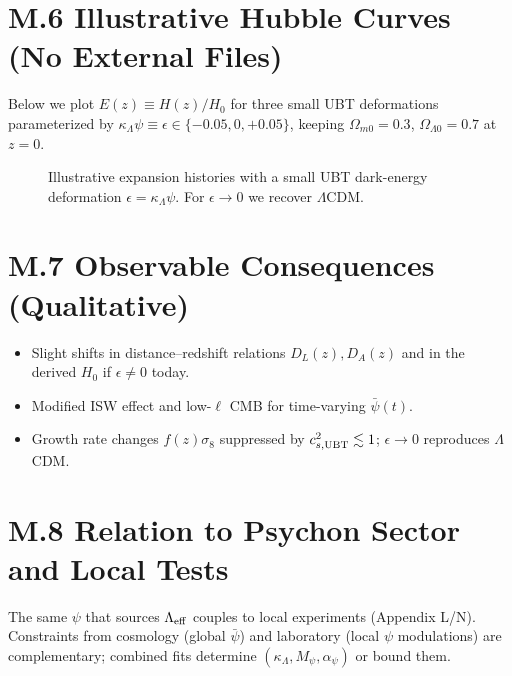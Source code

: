 \documentclass[12pt]{article}
\begin{document}
\section*{M.6 Illustrative Hubble Curves (No External Files)}
Below we plot $E(z)\equiv H(z)/H_0$ for three small UBT deformations parameterized by $\kappa_\Lambda\psi\equiv \epsilon\in\{-0.05,0,+0.05\}$, keeping $\Omega_{m0}=0.3$, $\Omega_{\Lambda 0}=0.7$ at $z=0$.
\begin{figure}[h!]
\centering
{}
\caption{Illustrative expansion histories with a small UBT dark-energy deformation $\epsilon=\kappa_\Lambda\psi$. For $\epsilon\to 0$ we recover $\Lambda$CDM.}
\label{fig:Hz}
\end{figure}

\section*{M.7 Observable Consequences (Qualitative)}
\begin{itemize}
\item Slight shifts in distance--redshift relations $D_L(z), D_A(z)$ and in the derived $H_0$ if $\epsilon\neq 0$ today.
\item Modified ISW effect and low-$\ell$ CMB for time-varying $\bar{\psi}(t)$.
\item Growth rate changes $f(z)\sigma_8$ suppressed by $c_{s,\rm UBT}^2\lesssim 1$; $\epsilon\to 0$ reproduces $\Lambda$CDM.
\end{itemize}

\section*{M.8 Relation to Psychon Sector and Local Tests}
The same $\psi$ that sources $\Lambda_{\rm eff}$ couples to local experiments (Appendix L/N). Constraints from cosmology (global $\bar{\psi}$) and laboratory (local $\psi$ modulations) are complementary; combined fits determine $(\kappa_\Lambda,M_\psi,\alpha_\psi)$ or bound them.
\end{document}
